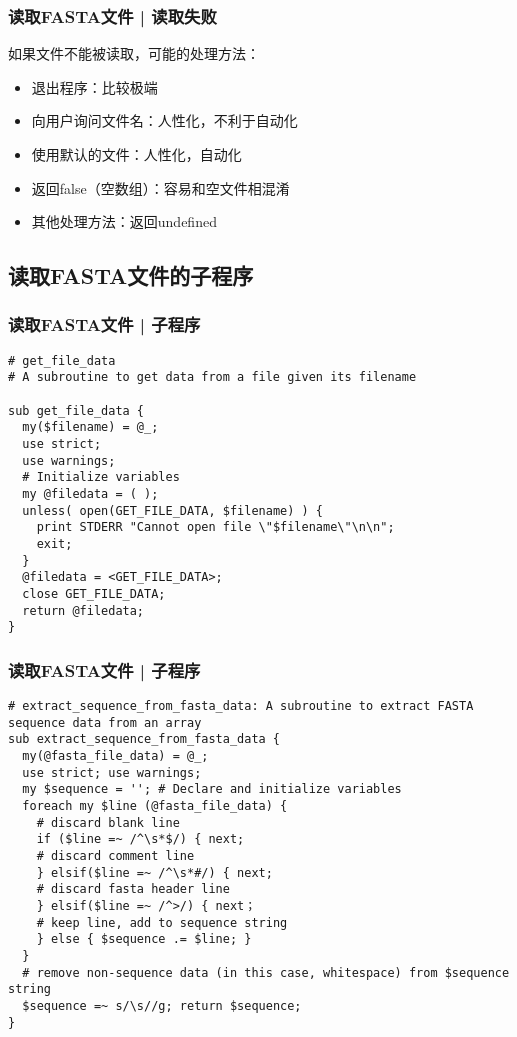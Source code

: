 \begin{frame}
  \frametitle{读取FASTA文件 | \alert{读取失败}}
  如果文件不能被读取，可能的处理方法：
  \begin{itemize}
    \item 退出程序：比较极端
    \item 向用户询问文件名：人性化，不利于自动化
    \item 使用默认的文件：人性化，自动化
    \item 返回false（空数组）：容易和空文件相混淆
    \item 其他处理方法：返回undefined
  \end{itemize}
\end{frame}

\subsection{读取FASTA文件的子程序}
\begin{frame}[fragile]
  \frametitle{读取FASTA文件 | 子程序}
\begin{lstlisting}[firstnumber=1,basicstyle=\footnotesize\tt,numberstyle=\scriptsize]
# get_file_data
# A subroutine to get data from a file given its filename

sub get_file_data {
  my($filename) = @_;
  use strict;
  use warnings;
  # Initialize variables
  my @filedata = ( );
  unless( open(GET_FILE_DATA, $filename) ) {
    print STDERR "Cannot open file \"$filename\"\n\n";
    exit;
  }
  @filedata = <GET_FILE_DATA>;
  close GET_FILE_DATA;
  return @filedata;
}
\end{lstlisting}
\end{frame}

\begin{frame}[fragile]
  \frametitle{读取FASTA文件 | 子程序}
\begin{lstlisting}[firstnumber=31,basicstyle=\footnotesize\tt,numberstyle=\scriptsize]
# extract_sequence_from_fasta_data: A subroutine to extract FASTA sequence data from an array
sub extract_sequence_from_fasta_data {
  my(@fasta_file_data) = @_;
  use strict; use warnings;
  my $sequence = ''; # Declare and initialize variables
  foreach my $line (@fasta_file_data) {
    # discard blank line
    if ($line =~ /^\s*$/) { next;
    # discard comment line 
    } elsif($line =~ /^\s*#/) { next;
    # discard fasta header line
    } elsif($line =~ /^>/) { next；
    # keep line, add to sequence string
    } else { $sequence .= $line; }
  }
  # remove non-sequence data (in this case, whitespace) from $sequence string
  $sequence =~ s/\s//g; return $sequence;
}
\end{lstlisting}
\end{frame}

